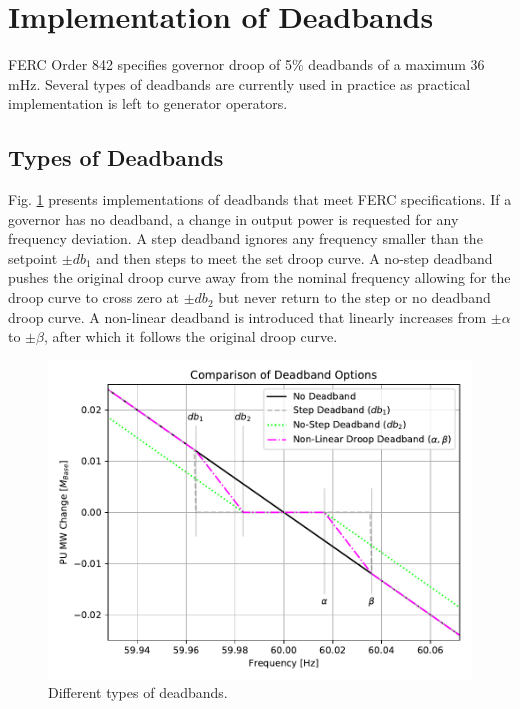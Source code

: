 \section{Implementation of Deadbands}
FERC Order 842 specifies governor droop of 5\% deadbands of a maximum 36 mHz\cite{ferc2018}.
Several types of deadbands are currently used in practice as practical implementation is left to generator operators.

\subsection{Types of Deadbands}
Fig. \ref{fig: deadbandType} presents implementations of deadbands that meet FERC specifications.
If a governor has no deadband, a change in output power is requested for any frequency deviation.
A step deadband ignores any frequency smaller than the setpoint $\pm db_1$ and then steps to meet the set droop curve.
A no-step deadband pushes the original droop curve away from the nominal frequency allowing for the droop curve to cross zero at $\pm db_2$ but never return to the step or no deadband droop curve.
A non-linear deadband is introduced that linearly increases from $\pm \alpha$ to $\pm \beta$, after which it follows the original droop curve.

\begin{figure}[!ht]
	\centering
	\includegraphics[width=\linewidth]{figures/dbAction3}
	\caption{Different types of deadbands.}
	\label{fig: deadbandType}
\end{figure}